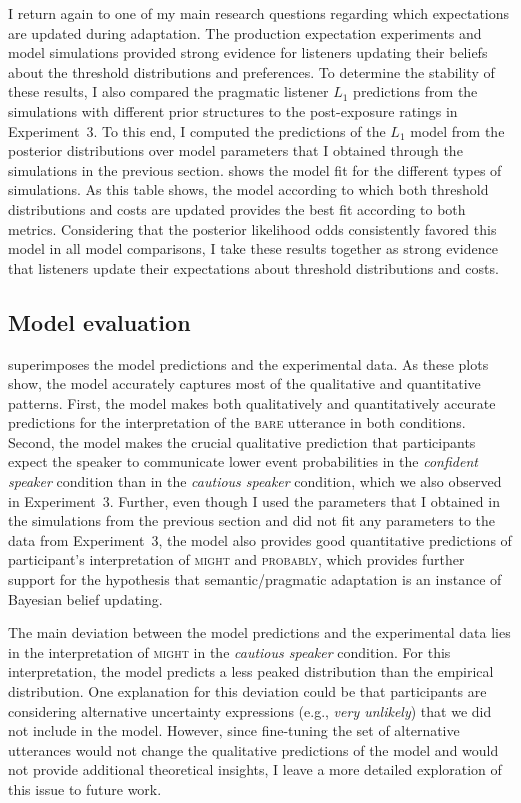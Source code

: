 I return again to one of my main research questions regarding which expectations are updated during adaptation. The production expectation experiments and model simulations provided strong evidence for listeners updating 
their beliefs about the threshold distributions and preferences. 
To determine the stability of these results, I also compared the pragmatic listener $L_1$ predictions from the simulations with different prior structures to the post-exposure ratings in Experiment~3. To this end, I computed the predictions of the $L_1$ model from the
posterior distributions over model parameters that I obtained through the simulations in the previous section.  shows the model fit
for the different types of simulations. As this table shows, the model according to which both threshold distributions and costs are updated provides the best fit according to both metrics. 
Considering that the posterior likelihood odds consistently favored this model in all model comparisons, I take these results together as strong evidence that listeners update their expectations about threshold distributions
and costs. 

\subsection{Model evaluation}


 superimposes the model predictions and the experimental data. As these plots show, the model accurately captures most of the qualitative and quantitative patterns. First, 
the model makes both qualitatively and quantitatively accurate predictions for the interpretation of the \textsc{bare} utterance in both conditions. Second, the model makes the crucial qualitative prediction that participants expect the speaker to communicate lower event probabilities in the \textit{confident speaker} condition than in the \textit{cautious speaker} condition, which we also observed in Experiment~3. Further, even though I used the parameters that I obtained in the simulations from the previous section and did not fit any parameters to the data from Experiment~3, the model also provides good quantitative predictions of participant's interpretation of \textsc{might} and \textsc{probably},
which provides further support for the hypothesis that semantic/pragmatic adaptation is an instance of Bayesian belief updating.

The main deviation between the model predictions and the experimental data lies in the interpretation of \textsc{might} in the \textit{cautious speaker} condition. For this interpretation, the model predicts a less peaked distribution than the empirical distribution.  One explanation for this deviation could be that participants are considering alternative uncertainty expressions (e.g., \textit{very unlikely}) that we did not include in the model.  However, since fine-tuning the set of alternative utterances would not change the qualitative predictions of the model and would not provide additional theoretical insights, I leave a more detailed exploration of this issue to future work. 

